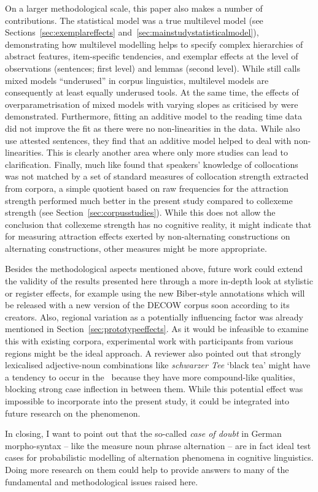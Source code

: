 On a larger methodological scale, this paper also makes a number of contributions.
The statistical model was a true multilevel model (see Sections~\ref{sec:exemplareffects} and~\ref{sec:mainstudystatisticalmodel}), demonstrating how multilevel modelling helps to specify complex hierarchies of abstract features, item-specific tendencies, and exemplar effects at the level of observations (sentences; first level) and lemmas (second level).
While \cite{Gries2015} still calls mixed models ``underused'' in corpus linguistics, multilevel models are consequently at least equally underused tools.
At the same time, the effects of overparametrisation of mixed models with varying slopes as criticised by \cite{BatesEa2015a} were demonstrated.
Furthermore, fitting an additive model to the reading time data did not improve the fit as there were no non-linearities in the data.
While \cite{DivjakEa2016} also use attested sentences, they find that an additive model helped to deal with non-linearities.
This is clearly another area where only more studies can lead to clarification.
Finally, much like \cite{Dabrowska2014} found that speakers' knowledge of collocations was not matched by a set of standard measures of collocation strength extracted from corpora, a simple quotient based on raw frequencies for the attraction strength performed much better in the present study compared to collexeme strength (see Section~\ref{sec:corpusstudies}).
While this does not allow the conclusion that collexeme strength has no cognitive reality, it might indicate that for measuring attraction effects exerted by non-alternating constructions on alternating constructions, other measures might be more appropriate.

Besides the methodological aspects mentioned above, future work could extend the validity of the results presented here through a more in-depth look at stylistic or register effects, for example using the new Biber-style annotations \citep{Biber1988} which will be released with a new version of the DECOW corpus soon according to its creators.
Also, regional variation as a potentially influencing factor was already mentioned in Section~\ref{sec:prototypeeffects}.
As it would be infeasible to examine this with existing corpora, experimental work with participants from various regions might be the ideal approach.
A reviewer also pointed out that strongly lexicalised adjective-noun combinations like \textit{schwarzer Tee} `black tea' might have a tendency to occur in the \NACa\ because they have more compound-like qualities, blocking strong case inflection in between them.
While this potential effect was impossible to incorporate into the present study, it could be integrated into future research on the phenomenon.

In closing, I want to point out that the so-called \textit{case of doubt} in German morpho-syntax -- like the measure noun phrase alternation -- are in fact ideal test cases for probabilistic modelling of alternation phenomena in cognitive linguistics.
Doing more research on them could help to provide answers to many of the fundamental and methodological issues raised here.
